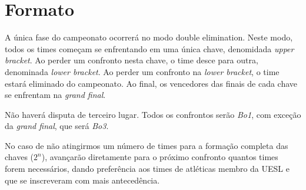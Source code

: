 \section{Formato}

A única fase do campeonato ocorrerá no modo double elimination. Neste modo, todos os times começam se enfrentando em uma única chave, denomidada \textit{upper bracket}. Ao perder um confronto nesta chave, o time desce para outra, denominada \textit{lower bracket}. Ao perder um confronto na \textit{lower bracket}, o time estará eliminado do campeonato. Ao final, os vencedores das finais de cada chave se enfrentam na \textit{grand final}.

Não haverá disputa de terceiro lugar. Todos os confrontos serão \textit{Bo1}, com exceção da \textit{grand final}, que será \textit{Bo3}.

No caso de não atingirmos um número de times para a formação completa das chaves (\(2^n\)), avançarão diretamente para o próximo confronto quantos times forem necessários, dando preferência aos times de atléticas membro da UESL e que se inscreveram com mais antecedência.
